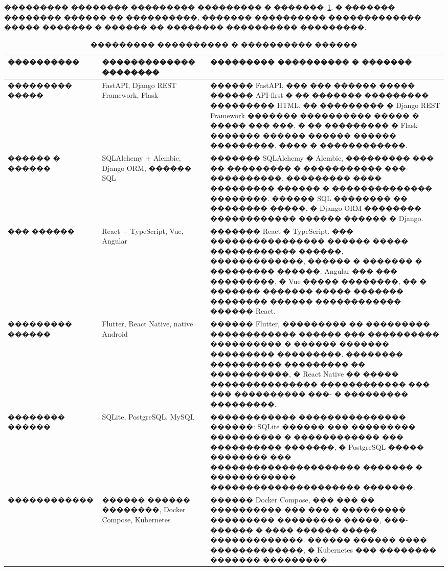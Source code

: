 ��������� �������� ��������� ��������� � �������~\ref{tab:analysis-tech-choice}. � ������� �������� ������ �� ����������, ������� ���������� ������������� ����� ������� � ������ �� �������� ���������� ���������.

\begin{table}[H]
\centering
\caption{��������� ���������� � ���������� ������}
\label{tab:analysis-tech-choice}
{\fontsize{12pt}{12pt}\selectfont
\setlength{\tabcolsep}{4pt}
\setlength{\extrarowheight}{1pt}
\renewcommand{\arraystretch}{1}
\begin{tabularx}{\textwidth}{|>{\RaggedRight\arraybackslash}p{32mm}|>{\RaggedRight\arraybackslash}p{45mm}|>{\RaggedRight\arraybackslash}X|}
\hline
���������� & ������������� �������� & ��������� ���������� � ������� \\
\hline
��������� ����� & FastAPI, Django REST Framework, Flask & ������ FastAPI, ��� ��� ������ ����� ������ API-first � �� ������� ��������� ��������� HTML. �� ��������� � Django REST Framework ������� ���������� ����� � ����� ��� ���, � �� ��������� � Flask ������� ������ ������ ������ ���������, ���� � ������������. \\
\hline
������ � ������ & SQLAlchemy + Alembic, Django ORM, ������ SQL & ������� SQLAlchemy � Alembic, ��������� ��� �� ��������� � ����������� ���-����������, ��������� ���� ��������� ������ � �������������� ��������. ������ SQL �������� �� �������� �����, � Django ORM �������� ������������ ������ ������ � Django. \\
\hline
���-������ & React + TypeScript, Vue, Angular & ������� React � TypeScript. ��� ���������������� ������ ����� ������������ ������, �������������, ������ � ������� � ��������� ������. Angular ��� ��� ���������, � Vue ����� ��������, �� � ������� ������� ����� ������� �������� ������ ������������ ������ React. \\
\hline
��������� ������ & Flutter, React Native, native Android & ������ Flutter, ��������� �� ��������� ������������ ������ ��� ���������� ���������� � ������ ������� ��������� ���������. �������� ���������� ��������� �� �����������, � React Native �� ����� ��������������� ������������ ��� ��� ���������� ���- � ��������� ���������. \\
\hline
�������� ������ & SQLite, PostgreSQL, MySQL & ������������ ��������������� ������: SQLite ������ ��� ��������� ���������� � ������������ ��� ���������� �������, � PostgreSQL ����� �������� ��� ��������������������� ������� � ������������ ��������������������� �������. \\
\hline
������������ & ������ ������ ��������, Docker Compose, Kubernetes & ������ Docker Compose, ��� ��� �� ���������� ��� ��� � ��������� ��������� ��������� �����, ���-������ � ���� ������ ����� �������������. ������ ������ ���� �������������, � Kubernetes ��� �������� ������� ���������. \\
\hline
\end{tabularx}
}
\end{table}

